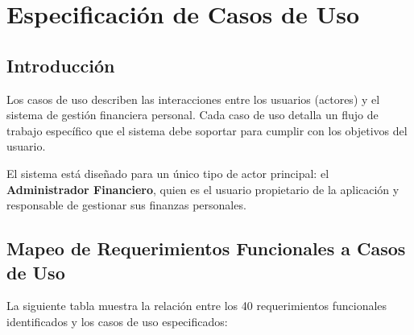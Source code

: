 \chapter{Especificación de Casos de Uso}

\section{Introducción}

Los casos de uso describen las interacciones entre los usuarios (actores) y el sistema de gestión financiera personal. Cada caso de uso detalla un flujo de trabajo específico que el sistema debe soportar para cumplir con los objetivos del usuario.

El sistema está diseñado para un único tipo de actor principal: el \textbf{Administrador Financiero}, quien es el usuario propietario de la aplicación y responsable de gestionar sus finanzas personales.

\section{Mapeo de Requerimientos Funcionales a Casos de Uso}

La siguiente tabla muestra la relación entre los 40 requerimientos funcionales identificados y los casos de uso especificados:

